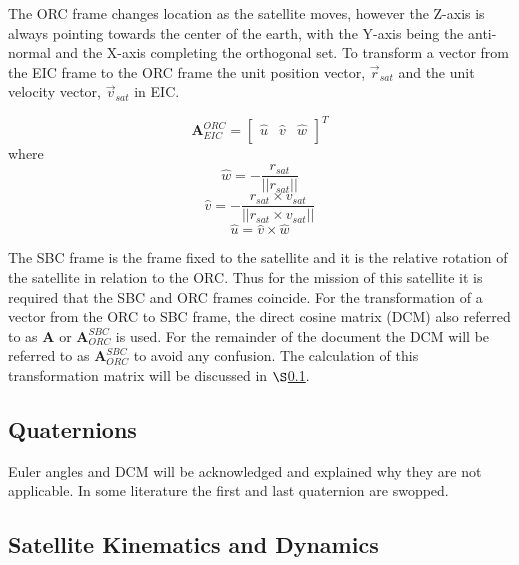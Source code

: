 The ORC frame changes location as the satellite moves, however the Z-axis is always pointing towards the center of the earth, with the Y-axis being the anti-normal and the X-axis completing the orthogonal set. To transform a vector from the EIC frame to the ORC frame the unit position vector, $\overrightarrow{r}_{sat}$ and the unit velocity vector, $\overrightarrow{v}_{sat}$ in EIC.

\begin{equation}
	\boldsymbol{A}^{ORC}_{EIC} = 
	\begin{bmatrix}
		\hat{u} & \hat{v} & \hat{w}\\
	\end{bmatrix}^T
\end{equation}
where
\begin{equation}
\hat{w} = -\frac{r_{sat}}{||r_{sat}||}
\end{equation}
\begin{equation}
\hat{v} = -\frac{r_{sat} \times v_{sat}}{||r_{sat} \times v_{sat}||}
\end{equation}
\begin{equation}
\hat{u} = \hat{v} \times \hat{w}
\end{equation}

The SBC frame is the frame fixed to the satellite and it is the relative rotation of the satellite in relation to the ORC. Thus for the mission of this satellite it is required that the SBC and ORC frames coincide. For the transformation of a vector from the ORC to SBC frame, the direct cosine matrix (DCM) also referred to as $\boldsymbol{A}$ or $\boldsymbol{A}^{SBC}_{ORC}$ is used. For the remainder of the document the DCM will be referred to as $\boldsymbol{A}^{SBC}_{ORC}$ to avoid any confusion. The calculation of this transformation matrix will be discussed in $\S$\ref{subsection_quaternions}.


\subsection{Quaternions}
\label{subsection_quaternions}
Euler angles and DCM will be acknowledged and explained why they are not applicable.
In some literature the first and last quaternion are swopped.

\subsection{Satellite Kinematics and Dynamics}

